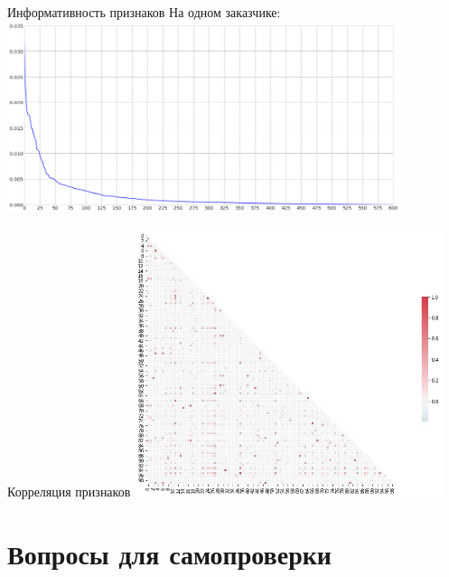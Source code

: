 \begin{frame}{Информативность признаков}
	На одном заказчике:
	\centering
	\includegraphics[width=11.5cm]{../pic/beh/informativity.png}
\end{frame}

\begin{frame}{Корреляция признаков}
\centering
\includegraphics[width=9cm]{../pic/beh/feature_correlation.png}

\end{frame}





\section{Вопросы для самопроверки}


